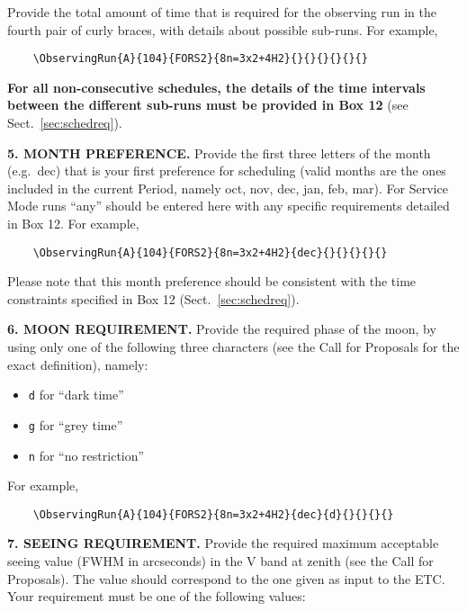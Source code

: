 \documentclass{article}
\begin{document}
\bigskip

Provide the total amount of time
that is required for the observing run in the fourth pair of curly braces, with details about possible sub-runs. For example,

\begin{verbatim}
    \ObservingRun{A}{104}{FORS2}{8n=3x2+4H2}{}{}{}{}{}{}
\end{verbatim}
{\bf For all non-consecutive schedules, the details of the time
  intervals between the different sub-runs must be provided in Box
  12} (see Sect.~\ref{sec:schedreq}). \\

\medskip

{\bf 5. MONTH PREFERENCE.} Provide the first three letters of the
month (e.g.\ dec) that is your first preference for
scheduling (valid months are the ones included in the current Period,
namely oct, nov, dec, jan,
feb, mar).
For Service Mode runs ``any'' should be entered here with any specific 
requirements detailed in Box 12. 
For example,
\begin{verbatim}
    \ObservingRun{A}{104}{FORS2}{8n=3x2+4H2}{dec}{}{}{}{}{}
\end{verbatim}
Please note that this month preference should be consistent with the time
constraints specified in Box 12 (Sect.~\ref{sec:schedreq}).

\medskip

{\bf 6. MOON REQUIREMENT.} Provide the required phase of the moon, by
using only one of the following three characters (see the Call for
Proposals for the exact definition), namely:
\begin{itemize}
\item {\tt d} for ``dark time''
\item {\tt g} for ``grey time''
\item {\tt n} for ``no restriction''
\end{itemize}
For example,
\begin{verbatim}
    \ObservingRun{A}{104}{FORS2}{8n=3x2+4H2}{dec}{d}{}{}{}{}
\end{verbatim}

\medskip

{\bf 7. SEEING REQUIREMENT.} Provide the required maximum acceptable seeing value (FWHM in arcseconds) in the V band at zenith (see the Call for Proposals). The value should correspond to the one given as input to the ETC.  Your requirement must be one of the following values:
\end{document}

